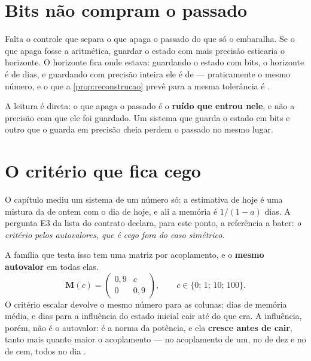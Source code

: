 \section{Bits não compram o passado}

Falta o controle que separa o que apaga o passado do que só o embaralha. Se o que apaga fosse a
aritmética, guardar o estado com mais precisão esticaria o horizonte. O horizonte fica onde estava: guardando o estado
com \numApagadoBitsMenor{} bits, o horizonte é de \numApagadoHorizonteDeBits{} dias, e guardando com
precisão inteira ele é de \numApagadoHorizonteSemBits{} --- praticamente o mesmo número, e o que a
\cref{prop:reconstrucao} prevê para a mesma tolerância é \numApagadoHorizonteDaFormula{}.

A leitura é direta: o que apaga o passado é o \textbf{ruído que entrou nele}, e não a precisão com que
ele foi guardado. Um sistema que guarda o estado em \numApagadoBitsMenor{} bits e outro que o guarda em precisão cheia
perdem o passado no mesmo lugar.

\section{O critério que fica cego}

O capítulo mediu um sistema de um número só: a estimativa de hoje é uma mistura da de ontem com o
dia de hoje, e ali a memória é $1/(1-a)$ dias. A pergunta E3 da lista do contrato declara, para
este ponto, a referência a bater: \emph{o critério pelos autovalores, que é cego fora do caso
simétrico}.

A família que testa isso tem uma matriz por acoplamento, e o \textbf{mesmo autovalor} em todas
elas.
\[ \bm{M}(c) = \begin{pmatrix} 0{,}9 & c \\ 0 & 0{,}9 \end{pmatrix}, \qquad c \in \{0;\, 1;\, 10;\, 100\}. \]
O critério escalar devolve o mesmo número para as \numOperadorAcoplamentos{} colunas:
\numOperadorMemoriaMedia{} dias de memória média, e \numOperadorDiasAutovalor{} dias para a
influência do estado inicial cair até \numOperadorTolerancia{} do que era. A influência, porém,
não é o autovalor: é a norma da potência, e ela \textbf{cresce antes de cair}, tanto mais quanto
maior o acoplamento --- \numOperadorPicoUm{} no acoplamento de um, \numOperadorPicoDez{} no de dez
e \numOperadorPicoCem{} no de cem, todos no dia \numOperadorPicoDiaCem\cite{trefethen1993hydrodynamic,henrici1962bounds}.

